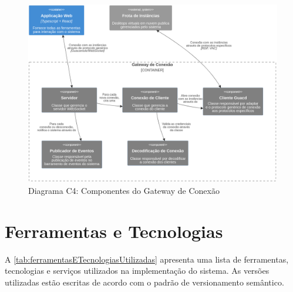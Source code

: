 \begin{figure}[H]
\caption{Diagrama C4: Componentes do Gateway de Conexão}
\label{fig:diagramaC4ComponentesDoGateway}
\includegraphics[width=\textwidth]{capitulos/2-metodologia/files/c4-component-connection-gateway.png}
\end{figure}

\section{Ferramentas e Tecnologias}
\label{sec:ferramentasETecnologias}

A \autoref{tab:ferramentasETecnologiasUtilizadas} apresenta uma lista de ferramentas, tecnologias e serviços utilizados na implementação do sistema. As versões utilizadas estão escritas de acordo com o padrão de versionamento semântico. \citep{semverdocs}

